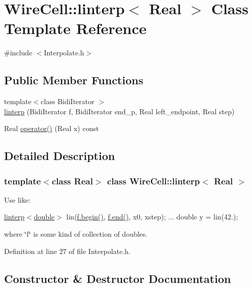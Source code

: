 \hypertarget{class_wire_cell_1_1linterp}{}\section{Wire\+Cell\+:\+:linterp$<$ Real $>$ Class Template Reference}
\label{class_wire_cell_1_1linterp}


{\ttfamily \#include $<$Interpolate.\+h$>$}

\subsection*{Public Member Functions}
\begin{DoxyCompactItemize}
\item 
{\footnotesize template$<$class Bidi\+Iterator $>$ }\\\hyperlink{class_wire_cell_1_1linterp_aa933d7ecd2b07b4d570b0d45225d012d}{linterp} (Bidi\+Iterator f, Bidi\+Iterator end\+\_\+p, Real left\+\_\+endpoint, Real step)
\item 
Real \hyperlink{class_wire_cell_1_1linterp_ad53b519a66ecde78514a73570d05930b}{operator()} (Real x) const
\end{DoxyCompactItemize}


\subsection{Detailed Description}
\subsubsection*{template$<$class Real$>$\newline
class Wire\+Cell\+::linterp$<$ Real $>$}

Use like\+:

\hyperlink{class_wire_cell_1_1linterp}{linterp$<$double$>$} lin(\hyperlink{namespaceinternal_a265f36d9dee68d3f44381347ef2fd5cb}{f.\+begin()}, \hyperlink{namespaceinternal_a94820de1710dc8038fa6f188adfe299b}{f.\+end()}, x0, xstep); ... double y = lin(42.);

where \char`\"{}f\char`\"{} is some kind of collection of doubles. 

Definition at line 27 of file Interpolate.\+h.



\subsection{Constructor \& Destructor Documentation}
\mbox{\label{class_wire_cell_1_1linterp_aa933d7ecd2b07b4d570b0d45225d012d}} 
